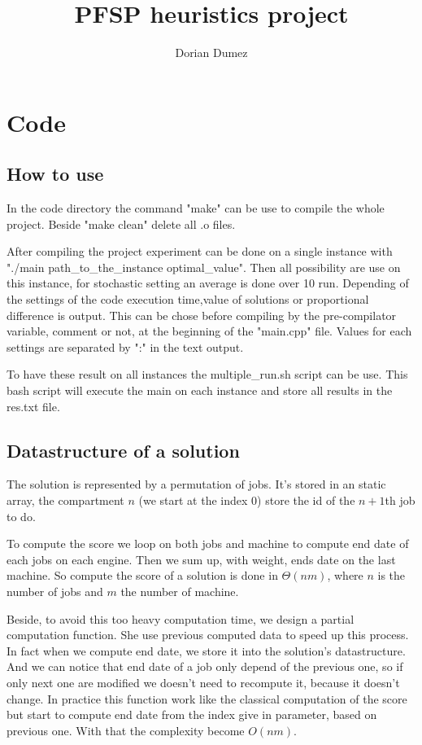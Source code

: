 \documentclass[12pt,a4paper]{article}
\title{PFSP heuristics project}
\author{Dorian Dumez}
\begin{document}
\maketitle

\section{Code}

\subsection{How to use}

In the code directory the command "make" can be use to compile the whole project. Beside "make clean" delete all .o files.

After compiling the project experiment can be done on a single instance with "./main path\_to\_the\_instance optimal\_value". Then all possibility are use on this instance, for stochastic setting an average is done over 10 run. Depending of the settings of the code execution time,value of solutions or proportional difference is output. This can be chose before compiling by the pre-compilator variable, comment or not, at the beginning of the "main.cpp" file. Values for each settings are separated by ":" in the text output.

To have these result on all instances the multiple\_run.sh script can be use. This bash script will execute the main on each instance and store all results in the res.txt file.

\subsection{Datastructure of a solution}

The solution is represented by a permutation of jobs. It's stored in an static array, the compartment $n$ (we start at the index $0$) store the id of the $n+1$th job to do.

To compute the score we loop on both jobs and machine to compute end date of each jobs on each engine. Then we sum up, with weight, ends date on the last machine. So compute the score of a solution is done in $\Theta(nm)$, where $n$ is the number of jobs and $m$ the number of machine.

Beside, to avoid this too heavy computation time, we design a partial computation function. She use previous computed data to speed up this process. In fact when we compute end date, we store it into the solution's datastructure. And we can notice that end date of a job only depend of the previous one, so if only next one are modified we doesn't need to recompute it, because it doesn't change. In practice this function work like the classical computation of the score but start to compute end date from the index give in parameter, based on previous one. With that the complexity become $O(nm)$.
\end{document}
